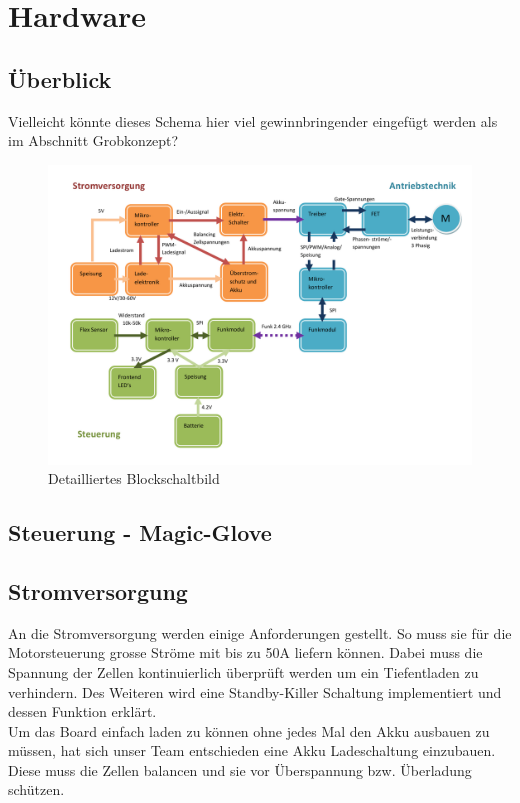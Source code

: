 \chapter{Hardware}
\label{Hardware}
\section{Überblick}

Vielleicht könnte dieses Schema hier viel gewinnbringender eingefügt werden als im Abschnitt Grobkonzept?

\begin{figure}[H]
	\centering
	\includegraphics[width=1\linewidth]{images/Grobkonzept_Blockschaltbild_detailliert}
	\caption[Detailliertes Blockschaltbild]{Detailliertes Blockschaltbild}
	\label{fig:grobkonzeptblockschaltbilddetailliert_2}
\end{figure}


\section{Steuerung - Magic-Glove}
\label{HW_MagicGlove}

\section{Stromversorgung}
\label{HW_Stromversorgung}
An die Stromversorgung werden einige Anforderungen gestellt. So muss sie für die Motorsteuerung grosse Ströme mit bis zu 50A liefern können. Dabei muss die Spannung der Zellen kontinuierlich überprüft werden um ein Tiefentladen zu verhindern. Des Weiteren wird eine Standby-Killer Schaltung implementiert und dessen Funktion erklärt.\\
Um das Board einfach laden zu können ohne jedes Mal den Akku ausbauen zu müssen, hat sich unser Team entschieden eine Akku Ladeschaltung einzubauen. Diese muss die Zellen balancen und sie vor Überspannung bzw. Überladung schützen. 
